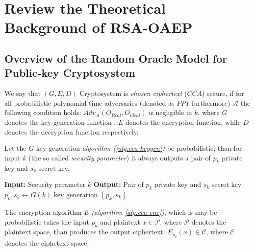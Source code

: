 \documentclass[10pt,a4paper]{article}
\begin{document}



\section{Review the Theoretical Background of RSA-OAEP}

\subsection{Overview of the Random Oracle Model for Public-key Cryptosystem}

We say that $(G,E,D)$ Cryptosystem is \textit{chosen ciphertext} ($CCA$) secure, if for all probabilistic polynomial time adversaries (denoted as $PPT$ furthermore) $\mathcal{A}$ the following  condition holds: 
$Adv_{\mathcal{A}} (O_{Real}, O_{ideal}) $ is negligible in $k$, where $G$ denotes the key-generation function , $E$ denotes the encryption function, while $D$ denotes the decryption function respectively.\cite{Damgaard2025}

Let the $G$ key generation \textit{algorithm (\ref{alg:cca-keygen})}  be probabilistic, than for input $k$ (the so called \textit{security parameter})  it always outputs a pair of $p_k$ private key and $s_k$ secret key.\cite{Damgaard2025}


\begin{algorithm}
\caption{Key Generation \(G(k)\)}
\begin{algorithmic}[1]
\State \textbf{Input:} Security parameter \(k\)
\State \textbf{Output:}  Pair of $p_k$ private key and $s_k$ secret key
\State \(p_k, s_k \gets G(k)\) key generation
\State \Return \((p_k, s_k)\)
\end{algorithmic}
\label{alg:cca-keygen}
\end{algorithm}

The encryption algorithm $E$ \textit{(algorithm \ref{alg:cca-enc})}, which is may be probabilistic takes the input $p_k$ and plaintext $x \in \mathcal{P}$, where $\mathcal{P}$ denotes the plaintext space, than produces the output ciphertext: $E_{p_k}(x) \in \mathcal{C}$, where $ \mathcal{C}$ denotes the ciphetext space. \cite{Damgaard2025}
\end{document}
